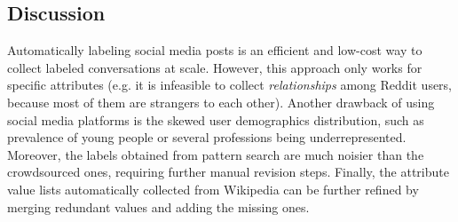 





\subsection{Discussion}

Automatically labeling social media posts is an efficient and low-cost way to collect labeled conversations at scale. However, this approach only works for specific attributes (e.g. it is infeasible to collect \textit{relationships} among Reddit users, because most of them are strangers to each other). Another drawback of using social media platforms is the skewed user demographics distribution, such as prevalence of young people or several professions being underrepresented. Moreover, the labels obtained from pattern search are much noisier than the crowdsourced ones, requiring further manual revision steps. Finally, the attribute value lists automatically collected from Wikipedia can be further refined by merging redundant values and adding the missing ones.